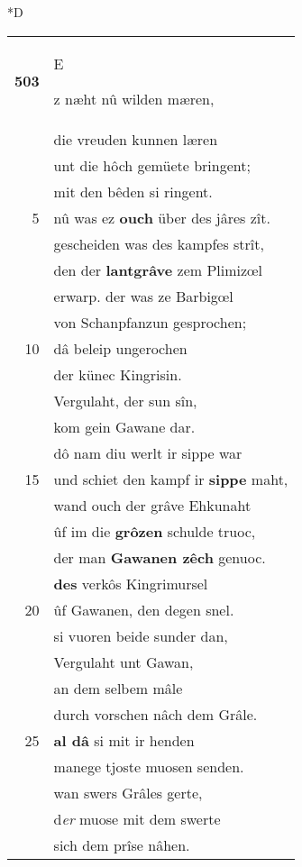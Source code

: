 \documentclass[8pt,a4paper,notitlepage]{article}
\begin{document}
\begin{table}[ht]
\begin{minipage}[t]{0.5\linewidth}
\small
\begin{center}*D
\end{center}
\begin{tabular}{rl}
\textbf{503} & \begin{large}E\end{large}z næht nû wilden mæren,\\ 
 & die vreuden kunnen læren\\ 
 & unt die hôch gemüete bringent;\\ 
 & mit den bêden si ringent.\\ 
5 & nû was ez \textbf{ouch} über des jâres zît.\\ 
 & gescheiden was des kampfes strît,\\ 
 & den der \textbf{lantgrâve} zem Plimizœl\\ 
 & erwarp. der was ze Barbigœl\\ 
 & von Schanpfanzun gesprochen;\\ 
10 & dâ beleip ungerochen\\ 
 & der künec Kingrisin.\\ 
 & Vergulaht, der sun sîn,\\ 
 & kom gein Gawane dar.\\ 
 & dô nam diu werlt ir sippe war\\ 
15 & und schiet den kampf ir \textbf{sippe} maht,\\ 
 & wand ouch der grâve Ehkunaht\\ 
 & ûf im die \textbf{grôzen} schulde truoc,\\ 
 & der man \textbf{Gawanen zêch} genuoc.\\ 
 & \textbf{des} verkôs Kingrimursel\\ 
20 & ûf Gawanen, den degen snel.\\ 
 & si vuoren beide sunder dan,\\ 
 & Vergulaht unt Gawan,\\ 
 & an dem selbem mâle\\ 
 & durch vorschen nâch dem Grâle.\\ 
25 & \textbf{al dâ} si mit ir henden\\ 
 & manege tjoste muosen senden.\\ 
 & wan swers Grâles gerte,\\ 
 & d\textit{er} muose mit dem swerte\\ 
 & sich dem prîse nâhen.\\ 

\end{tabular}
\end{minipage}
\end{table}
\end{document}
